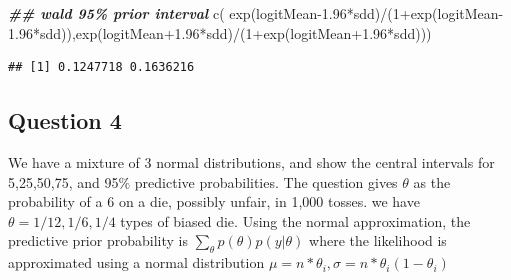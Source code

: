 \documentclass[
]{book}
\newenvironment{Shaded}{\begin{snugshade}}{\end{snugshade}}
\newcommand{\DecValTok}[1]{\textcolor[rgb]{0.00,0.00,0.81}{#1}}
\newcommand{\DocumentationTok}[1]{\textcolor[rgb]{0.56,0.35,0.01}{\textbf{\textit{#1}}}}
\newcommand{\FloatTok}[1]{\textcolor[rgb]{0.00,0.00,0.81}{#1}}
\newcommand{\FunctionTok}[1]{\textcolor[rgb]{0.00,0.00,0.00}{#1}}
\newcommand{\NormalTok}[1]{#1}
\newcommand{\SpecialCharTok}[1]{\textcolor[rgb]{0.00,0.00,0.00}{#1}}
\theoremstyle{definition}
\theoremstyle{definition}
\theoremstyle{definition}
\theoremstyle{definition}
\theoremstyle{remark}
\begin{document}
\begin{Shaded}
\begin{Highlighting}[]
\DocumentationTok{\#\# wald 95\% prior interval}
\FunctionTok{c}\NormalTok{( }\FunctionTok{exp}\NormalTok{(logitMean}\FloatTok{{-}1.96}\SpecialCharTok{*}\NormalTok{sdd)}\SpecialCharTok{/}\NormalTok{(}\DecValTok{1}\SpecialCharTok{+}\FunctionTok{exp}\NormalTok{(logitMean}\FloatTok{{-}1.96}\SpecialCharTok{*}\NormalTok{sdd)),}\FunctionTok{exp}\NormalTok{(logitMean}\FloatTok{+1.96}\SpecialCharTok{*}\NormalTok{sdd)}\SpecialCharTok{/}\NormalTok{(}\DecValTok{1}\SpecialCharTok{+}\FunctionTok{exp}\NormalTok{(logitMean}\FloatTok{+1.96}\SpecialCharTok{*}\NormalTok{sdd)))}
\end{Highlighting}
\end{Shaded}

\begin{verbatim}
## [1] 0.1247718 0.1636216
\end{verbatim}

\hypertarget{question-4}{%
\subsection*{Question 4}\label{question-4}}

We have a mixture of 3 normal distributions, and show the central intervals for 5,25,50,75, and 95\(\%\) predictive probabilities. The question gives \(\theta\) as the probability of a 6 on a die, possibly unfair, in 1,000 tosses. we have \(\theta= 1/12,1/6, 1/4\) types of biased die. Using the normal approximation, the predictive prior probability is \(\sum_{\theta}p(\theta)p(y| \theta)\) where the likelihood is approximated using a normal distribution \(\mu = n*\theta_i, \sigma = n*\theta_i(1-\theta_i)\)
\end{document}
